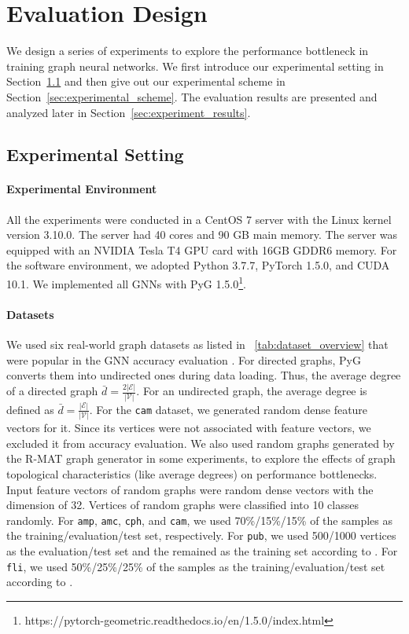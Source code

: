 \section{Evaluation Design}
\label{sec:experimental_design}

We design a series of experiments to explore the performance bottleneck in training graph neural networks.
We first introduce our experimental setting in Section~\ref{sec:experimental_env} and then give out our experimental scheme in Section~\ref{sec:experimental_scheme}.
The evaluation results are presented and analyzed later in Section~\ref{sec:experiment_results}.

\subsection{Experimental Setting}
\label{sec:experimental_env}

\paragraph{Experimental Environment}
All the experiments were conducted in a CentOS 7 server with the Linux kernel version 3.10.0.
The server had 40 cores and 90 GB main memory.
The server was equipped with an NVIDIA Tesla T4 GPU card with 16GB GDDR6 memory.
For the software environment, we adopted Python 3.7.7, PyTorch 1.5.0, and CUDA 10.1.
We implemented all GNNs with PyG 1.5.0\footnote{https://pytorch-geometric.readthedocs.io/en/1.5.0/index.html}.

\paragraph{Datasets}

We used six real-world graph datasets as listed in \tablename~\ref{tab:dataset_overview} that were popular in the GNN accuracy evaluation \cite{yang2016_revisiting_semisupervised, zeng2020_graphsaint, shchur2018_pitfall_of_gnn}.
%
For directed graphs, PyG converts them into undirected ones during data loading.
%
Thus, the average degree of a directed graph $\bar{d}=\frac{2|\mathcal{E}|}{|\mathcal{V}|}$.
%
For an undirected graph, the average degree is defined as $\bar{d}=\frac{|\mathcal{E}|}{|\mathcal{V}|}$.
%
For the \texttt{cam} dataset, we generated random dense feature vectors for it.
%
Since its vertices were not associated with feature vectors, we excluded it from accuracy evaluation.
%
We also used random graphs generated by the R-MAT graph generator \cite{rmat-generator} in some experiments, to explore the effects of graph topological characteristics (like average degrees) on performance bottlenecks.
%
Input feature vectors of random graphs were random dense vectors with the dimension of 32.
%
Vertices of random graphs were classified into 10 classes randomly.
%
For \texttt{amp}, \texttt{amc}, \texttt{cph}, and \texttt{cam}, we used 70\%/15\%/15\% of the samples as the training/evaluation/test set, respectively.
%
For \texttt{pub}, we used 500/1000 vertices as the evaluation/test set and the remained as the training set according to \cite{chen2018_fastgcn}.
%
For \texttt{fli}, we used 50\%/25\%/25\% of the samples as the training/evaluation/test set according to \cite{zeng2020_graphsaint}.


